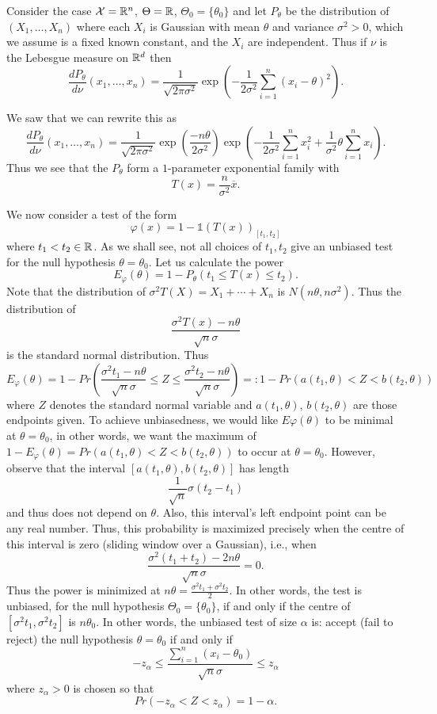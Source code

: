\documentclass[twoside, a4paper, 10pt]{amsart}
\begin{document}
\begin{eg} \label{eg: Gaussian test unbiased}
Consider the case $\mathcal{X} = \mathbb{R}^n$, $\Theta = \mathbb{R}$, $\Theta_0 = \{\theta_0\}$ and let $P_{\theta}$ be the distribution of $(X_1, \ldots, X_n)$ where each $X_i$ is Gaussian with mean $\theta$ and variance $\sigma^2>0$, which we assume is a fixed known constant, and the $X_i$ are independent. Thus if $\nu$ is the Lebesgue measure on $\mathbb{R}^d$ then $$\frac{dP_{\theta}}{d\nu}(x_1, \ldots, x_n) = \frac{1}{\sqrt{2\pi\sigma^2}} \exp\left(-\frac{1}{2\sigma^2}\sum_{i=1}^n(x_i - \theta)^2 \right). $$

We saw that we can rewrite this as 
$$\frac{dP_{\theta}}{d\nu}(x_1, \ldots, x_n)  = \frac{1}{\sqrt{2\pi\sigma^2}} \exp\left( \frac{-n\theta}{2\sigma^2} \right) \exp\left(-\frac{1}{2\sigma^2}\sum_{i=1}^n x_i^2 +\frac{1}{\sigma^2}\theta \sum_{i=1}^n x_i\right).$$
Thus we see that the $P_{\theta}$ form a $1$-parameter exponential family with $$T(x) = \frac{n}{\sigma^2} \overline{x}.$$

We now consider a test of the form $$\varphi(x) = 1 - \mathds{1}(T(x))_{[t_1,t_2]}$$ where $t_1<t_2 \in \mathbb{R}$. As we shall see, not all choices of $t_1,t_2$ give an unbiased test for the null hypothesis $\theta = \theta_0$. Let us calculate the power
$$E_{\varphi}(\theta) = 1 - P_{\theta}(t_1 \leq T(x) \leq t_2).$$ Note that the distribution of $\sigma^2 T(X) = X_1 + \cdots + X_n$ is $N(n\theta, n\sigma^2)$. Thus the distribution of $$\frac{\sigma^2T(x) - n\theta}{\sqrt{n}\sigma}$$ is the standard normal distribution. Thus $$E_{\varphi}(\theta) = 1 - Pr(\frac{\sigma^2t_1 - n\theta}{\sqrt{n}\sigma} \leq Z \leq \frac{\sigma^2t_2 - n\theta}{\sqrt{n}\sigma}  ) =: 1 - Pr(a(t_1, \theta) < Z < b(t_2, \theta))$$ where $Z$ denotes the standard normal variable and $a(t_1, \theta)$, $b(t_2, \theta)$ are those endpoints given. 
To achieve unbiasedness, we would like $E{\varphi}(\theta)$ to be minimal at $\theta = \theta_0$, in other words, we want the maximum of $1 - E_{\varphi}(\theta) = Pr(a(t_1,\theta) < Z < b(t_2, \theta))$ to occur at $\theta = \theta_0$.
However, observe that the interval $[a(t_1,\theta), b(t_2,\theta)]$ has length $$\frac{1}{\sqrt{n}} \sigma(t_2 - t_1)$$ and thus does not depend on $\theta$. Also, this interval's left endpoint point can be any real number. Thus, this probability is maximized precisely when the centre of this interval is zero (sliding window over a Gaussian), i.e.,  when $$\frac{\sigma^2(t_1+t_2) - 2n\theta}{\sqrt{n}\sigma} = 0.$$ Thus the power is minimized at $n\theta = \frac{\sigma^2t_1 + \sigma^2t_2}{2}$.
In other words, the test is unbiased, for the null hypothesis $\Theta_0 = \{\theta_0\}$, if and only if the centre of $[\sigma^2 t_1,\sigma^2t_2]$ is $n\theta_0$. In other words, the unbiased test of size $\alpha$ is: accept (fail to reject) the null hypothesis $\theta = \theta_0$ if and only if 
$$-z_{\alpha} \leq \frac{\sum_{i=1}^n (x_i - \theta_0)}{\sqrt{n}\sigma} \leq z_{\alpha}$$ where $z_{\alpha} >0$ is chosen so that $$Pr(-z_{\alpha} < Z < z_{\alpha}) = 1 - \alpha.$$

\end{eg}
\end{document}
